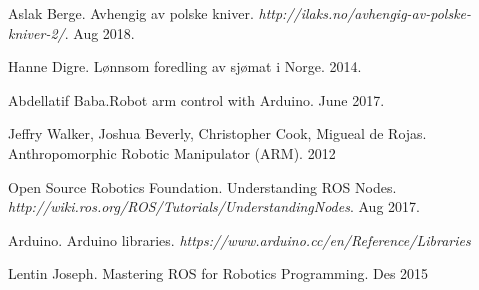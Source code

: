 \documentclass[11pt,a4paper, titlepage]{article}
\begin{document}
\newpage
	
	
\begin{thebibliography}{1}

 Aslak Berge. Avhengig av polske kniver. \textit{http://ilaks.no/avhengig-av-polske-kniver-2/}. Aug 2018.

 Hanne Digre. Lønnsom foredling av sjømat i Norge. 2014.

 Abdellatif Baba.Robot arm control with Arduino. June 2017.

 Jeffry Walker, Joshua Beverly, Christopher Cook, Migueal de Rojas. Anthropomorphic Robotic Manipulator (ARM). 2012

 Open Source Robotics Foundation. Understanding ROS Nodes.
\textit{http://wiki.ros.org/ROS/Tutorials/UnderstandingNodes}. Aug 2017.

 Arduino. Arduino libraries. \textit{https://www.arduino.cc/en/Reference/Libraries}

 Lentin Joseph. Mastering ROS for Robotics Programming. Des 2015



\newpage	

\end{thebibliography}	
	
\end{document}
